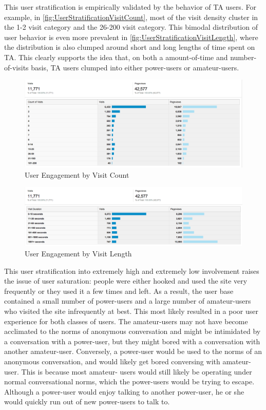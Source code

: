 This user stratification is empirically validated by the behavior of TA users. For example, in \autoref{fig:UserStratificationVisitCount}, most of the visit density cluster in the 1-2 visit category and the 26-200 visit category. This bimodal distribution of user behavior is even more prevalent in \autoref{fig:UserStratificationVisitLength}, where the distribution is also clumped around short and long lengths of time spent on TA. This clearly supports the idea that, on both a amount-of-time and number-of-visits basis, TA users clumped into either power-users or amateur-users.

\begin{figure}[H]
\centering
\includegraphics[trim= 0mm 0mm 0mm 0mm, clip, scale=0.3]{./Figures/UserStratificationVisitCount}
\caption{User Engagement by Visit Count}
\label{fig:UserStratificationVisitCount}
\end{figure}

\begin{figure}[H]
\centering
\includegraphics[trim= 0mm 0mm 0mm 0mm, clip, scale=0.3]{./Figures/UserStratificationVisitLength}
\caption{User Engagement by Visit Length}
\label{fig:UserStratificationVisitLength}
\end{figure}

This user stratification into extremely high and extremely low involvement raises the issue of user saturation: people were either hooked and used the site very frequently or they used it a few times and left. As a result, the user base contained a small number of power-users and a large number of amateur-users who visited the site infrequently at best. This most likely resulted in a poor user experience for both classes of users. The amateur-users may not have become acclimated to the norms of anonymous conversation and might be intimidated by a conversation with a power-user, but they might bored with a conversation with another amateur-user. Conversely, a power-user would be used to the norms of an anonymous conversation, and would likely get bored conversing with amateur-user. This is because most amateur- users would still likely be operating under normal conversational norms, which the power-users would be trying to escape. Although a power-user would enjoy talking to another power-user, he or she would quickly run out of new power-users to talk to.

